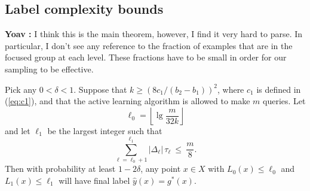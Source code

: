 \documentclass[anon,12pt]{colt2022} %
\def\yh{{\widehat{y}}}
\newcommand{\comment}[3]{{\color{#1} {\bf #2 :} #3}}
\newcommand{\yoav}[1]{\comment{blue}{Yoav}{#1}}
\begin{document}
\subsection{Label complexity bounds} 

\yoav{I think this is the main theorem, however, I find it very hard
  to parse. In particular, I don't see any reference to the fraction
  of examples that are in the focused group at each level. These
  fractions have to be small in order for our sampling to be effective.}

\begin{theorem}
Pick any $0 < \delta < 1$. Suppose that $k \geq (8c_1/(b_2-b_1))^2$, where $c_1$ is defined in (\ref{eq:c1}), and that the active learning algorithm is allowed to make $m$ queries. Let
$$ \ell_0 = \left\lfloor \lg \frac{m}{32k} \right\rfloor $$
and let $\ell_1$ be the largest integer such that
$$ \sum_{\ell = \ell_0 + 1}^{\ell_1} |\Delta_{\ell}| \, \tau_\ell \ \leq \ \frac{m}{8} .$$
Then with probability at least $1-2\delta$, any point $x \in X$ with $L_0(x) \leq \ell_0$ and $L_1(x) \leq \ell_1$ will have final label $\yh(x) = g^*(x)$.
\label{thm:label-complexity}
\end{theorem}
\end{document}
